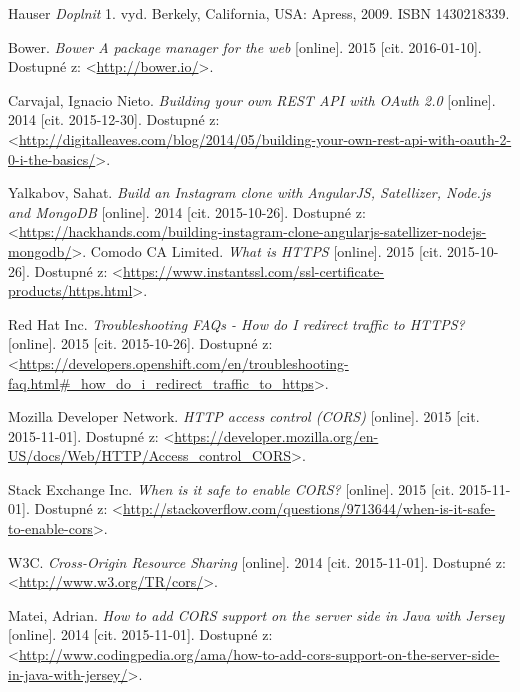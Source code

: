 \documentclass[12pt,oneside]{fithesis2}
\begin{document}
\begin{thebibliography}{59}
  		Hauser
  		\emph{Doplnit}
  		1. vyd. 
  		Berkely, California, USA: Apress, 2009.
		ISBN 1430218339.		
		
  		Bower.
  		\emph{Bower A package manager for the web}
  		[online].
  		2015
  		[cit. 2016-01-10].
  		Dostupné z: <\url{http://bower.io/}>.
  		
  		Carvajal, Ignacio Nieto.
  		\emph{Building your own REST API with OAuth 2.0}
  		[online].
  		2014
  		[cit. 2015-12-30].
  		Dostupné z: <\url{http://digitalleaves.com/blog/2014/05/building-your-own-rest-api-with-oauth-2-0-i-the-basics/}>.  		

  		Yalkabov, Sahat.
  		\emph{Build an Instagram clone with AngularJS, Satellizer, Node.js and MongoDB}
  		[online].
  		2014
  		[cit. 2015-10-26].
  		Dostupné z: <\url{https://hackhands.com/building-instagram-clone-angularjs-satellizer-nodejs-mongodb/}>.  		
  		Comodo CA Limited.
  		\emph{What is HTTPS} 
  		[online].
  		2015
  		[cit. 2015-10-26].
  		Dostupné z: <\url{https://www.instantssl.com/ssl-certificate-products/https.html}>.
	
  		Red Hat Inc.
  		\emph{Troubleshooting FAQs - How do I redirect traffic to HTTPS?}
  		[online].
  		2015
  		[cit. 2015-10-26].
  		Dostupné z: <\url{https://developers.openshift.com/en/troubleshooting-faq.html#_how_do_i_redirect_traffic_to_https}>.
  		
  		Mozilla Developer Network.
  		\emph{HTTP access control (CORS)}
  		[online].
  		2015
  		[cit. 2015-11-01].
  		Dostupné z: <\url{https://developer.mozilla.org/en-US/docs/Web/HTTP/Access_control_CORS}>.  		
  		
  		Stack Exchange Inc.
  		\emph{When is it safe to enable CORS?}
  		[online].
  		2015
  		[cit. 2015-11-01].
  		Dostupné z: <\url{http://stackoverflow.com/questions/9713644/when-is-it-safe-to-enable-cors}>.  		
  		
  		W3C.
  		\emph{Cross-Origin Resource Sharing}
  		[online].
  		2014
  		[cit. 2015-11-01].
  		Dostupné z: <\url{http://www.w3.org/TR/cors/}>.  	
  		
  		Matei, Adrian.
  		\emph{How to add CORS support on the server side in Java with Jersey}
  		[online].
  		2014
  		[cit. 2015-11-01].
  		Dostupné z: <\url{http://www.codingpedia.org/ama/how-to-add-cors-support-on-the-server-side-in-java-with-jersey/}>.  		
  		

\end{thebibliography}
\end{document}
